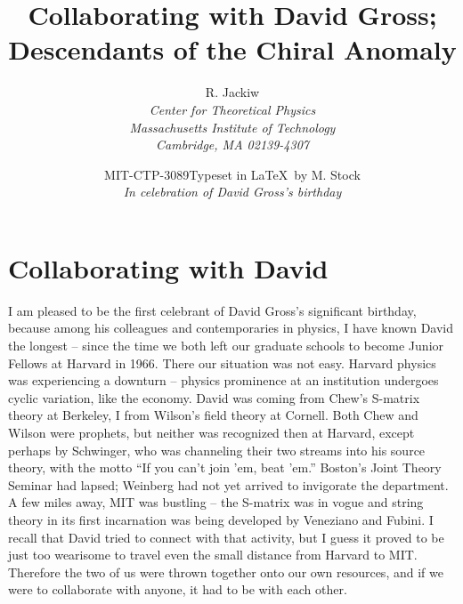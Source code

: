 \documentclass[a4paper,12pt,twoside]{article}
\begin{document}
 
\title{Collaborating with David Gross;\\
Descendants of the Chiral Anomaly}
\author{R. Jackiw\\
\small\it Center for Theoretical Physics\\ 
\small\it Massachusetts Institute of Technology\\ 
\small\it Cambridge, MA 02139-4307}
\date{\small MIT-CTP-3089\quad Typeset in \LaTeX\ by M.
Stock\\[2ex]
\large\itshape In celebration of David Gross's birthday}
\maketitle


\pagestyle{myheadings}
\thispagestyle{empty}




\section{Collaborating with David}

I am pleased to be the first celebrant of David Gross's significant birthday,
because among his colleagues and contemporaries in physics, I have known David the
longest -- since the time we both left our graduate schools to become Junior Fellows
at Harvard in 1966.   There our situation was not easy.  Harvard physics was
experiencing a downturn -- physics prominence at an institution undergoes cyclic
variation, like the economy.  David was coming from Chew's S-matrix theory at
Berkeley, I from Wilson's field theory at Cornell. Both Chew and Wilson were
prophets, but neither was recognized then at Harvard, except perhaps by Schwinger,
who was channeling their two streams into his source theory, with the motto ``If you
can't join 'em, beat 'em.''  Boston's Joint Theory Seminar had lapsed; Weinberg had
not yet arrived to invigorate the department.  A few miles away, MIT was bustling --
the S-matrix was in vogue and string theory in its first incarnation was being
developed by Veneziano and Fubini. I recall that David tried to connect with that
activity, but I guess it proved to be just too wearisome to travel even the small
distance from Harvard to MIT. Therefore the two of us were thrown together onto
our own resources, and if we were to collaborate with anyone, it had to be with each
other.  
\end{document}
